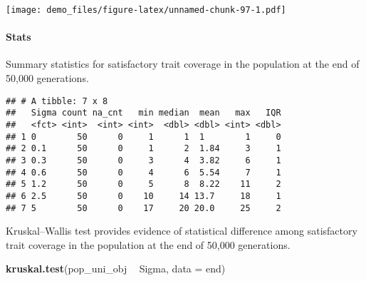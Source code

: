 \documentclass[]{book}
\newenvironment{Shaded}{\begin{snugshade}}{\end{snugshade}}
\newcommand{\DataTypeTok}[1]{\textcolor[rgb]{0.13,0.29,0.53}{#1}}
\newcommand{\KeywordTok}[1]{\textcolor[rgb]{0.13,0.29,0.53}{\textbf{#1}}}
\newcommand{\NormalTok}[1]{#1}
\newcommand{\OperatorTok}[1]{\textcolor[rgb]{0.81,0.36,0.00}{\textbf{#1}}}
\newcommand{\OtherTok}[1]{\textcolor[rgb]{0.56,0.35,0.01}{#1}}
\newcommand{\StringTok}[1]{\textcolor[rgb]{0.31,0.60,0.02}{#1}}
\let\oldparagraph\paragraph
\renewcommand{\paragraph}[1]{\oldparagraph{#1}\mbox{}}
\begin{document}
\texttt{[image: demo\_files/figure-latex/unnamed-chunk-97-1.pdf]}

\hypertarget{stats-56}{%
\paragraph{Stats}\label{stats-56}}

Summary statistics for satisfactory trait coverage in the population at the end of 50,000 generations.

\begin{Shaded}
\end{Shaded}

\begin{verbatim}
## # A tibble: 7 x 8
##   Sigma count na_cnt   min median  mean   max   IQR
##   <fct> <int>  <int> <int>  <dbl> <dbl> <int> <dbl>
## 1 0        50      0     1      1  1        1     0
## 2 0.1      50      0     1      2  1.84     3     1
## 3 0.3      50      0     3      4  3.82     6     1
## 4 0.6      50      0     4      6  5.54     7     1
## 5 1.2      50      0     5      8  8.22    11     2
## 6 2.5      50      0    10     14 13.7     18     1
## 7 5        50      0    17     20 20.0     25     2
\end{verbatim}

Kruskal--Wallis test provides evidence of statistical difference among satisfactory trait coverage in the population at the end of 50,000 generations.

\begin{Shaded}
\begin{Highlighting}[]
\KeywordTok{kruskal.test}\NormalTok{(pop_uni_obj }\OperatorTok{~}\StringTok{ }\NormalTok{Sigma, }\DataTypeTok{data =}\NormalTok{ end)}
\end{Highlighting}
\end{Shaded}
\end{document}
